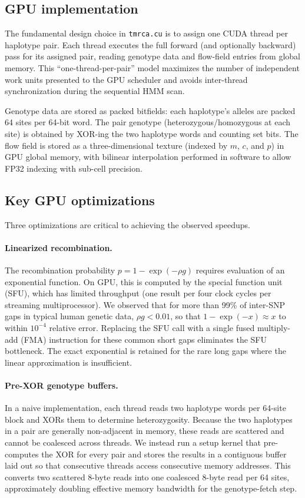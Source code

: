 \documentclass[10pt,letterpaper]{article}
\begin{document}
\subsection*{GPU implementation}

The fundamental design choice in \texttt{tmrca.cu} is to assign one CUDA thread per haplotype pair.
Each thread executes the full forward (and optionally backward) pass for its assigned pair, reading genotype data and flow-field entries from global memory.
This ``one-thread-per-pair'' model maximizes the number of independent work units presented to the GPU scheduler and avoids inter-thread synchronization during the sequential HMM scan.

Genotype data are stored as packed bitfields: each haplotype's alleles are packed 64 sites per 64-bit word.
The pair genotype (heterozygous/homozygous at each site) is obtained by XOR-ing the two haplotype words and counting set bits.
The flow field is stored as a three-dimensional texture (indexed by $m$, $c$, and $p$) in GPU global memory, with bilinear interpolation performed in software to allow FP32 indexing with sub-cell precision.

\subsection*{Key GPU optimizations}

Three optimizations are critical to achieving the observed speedups.

\paragraph{Linearized recombination.}
The recombination probability $p = 1 - \exp(-\rho g)$ requires evaluation of an exponential function.
On GPU, this is computed by the special function unit (SFU), which has limited throughput (one result per four clock cycles per streaming multiprocessor).
We observed that for more than 99\% of inter-SNP gaps in typical human genetic data, $\rho g < 0.01$, so that $1 - \exp(-x) \approx x$ to within $10^{-4}$ relative error.
Replacing the SFU call with a single fused multiply-add (FMA) instruction for these common short gaps eliminates the SFU bottleneck.
The exact exponential is retained for the rare long gaps where the linear approximation is insufficient.

\paragraph{Pre-XOR genotype buffers.}
In a naive implementation, each thread reads two haplotype words per 64-site block and XORs them to determine heterozygosity.
Because the two haplotypes in a pair are generally non-adjacent in memory, these reads are scattered and cannot be coalesced across threads.
We instead run a setup kernel that pre-computes the XOR for every pair and stores the results in a contiguous buffer laid out so that consecutive threads access consecutive memory addresses.
This converts two scattered 8-byte reads into one coalesced 8-byte read per 64 sites, approximately doubling effective memory bandwidth for the genotype-fetch step.
\end{document}
